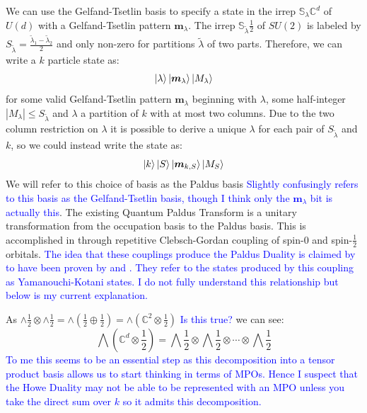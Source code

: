 \documentclass[aps,prx,twocolumn,floatfix,10pt,amssymb,amsfont,amsmath,superscriptaddress,float,nofootinbib,longbibliography,nobalancelastpage]{revtex4-2}
\begin{document}
We can use the Gelfand-Tsetlin basis to specify a state in the irrep $\mathbb{S}_{\lambda} \mathbb{C}^d$ of $U(d)$ with a Gelfand-Tsetlin pattern $\bm m_{\lambda}$. The irrep $\mathbb{S}_{\tilde \lambda} \frac{1}{2}$ of $SU(2)$ is labeled by $S_{\tilde \lambda} =\frac{\tilde \lambda_1 - \tilde \lambda_2}{2}$ and only non-zero for partitions $\tilde \lambda$ of two parts.  Therefore, we can write a $k$ particle state as:
\begin{equation}
    \ket{\lambda} \ket{\bm m_{\lambda}} \ket{M_{\lambda}}
\end{equation}
for some valid Gelfand-Tsetlin pattern $\bm m_{\lambda}$ beginning with $\lambda$, some half-integer $|M_{\lambda}| \leq S_{\tilde \lambda}$ and $\lambda$ a partition of $k$ with at most two columns. Due to the two column restriction on $\lambda$ it is possible to derive a unique $\lambda$ for each pair of $S_{\tilde \lambda}$ and $k$, so we could instead write the state as:
\begin{equation}
    \ket{k}\ket{S}\ket{\bm m_{k,S}} \ket{M_{S}}
\end{equation}
We will refer to this choice of basis as the Paldus basis \textcolor{blue}{Slightly confusingly \cite{burkat2025quantum} refers to this basis as the Gelfand-Tsetlin basis, though I think only the $\bm m_{\lambda}$ bit is actually this}. The existing Quantum Paldus Transform is a unitary transformation from the occupation basis to the Paldus basis. This is accomplished in \cite{burkat2025quantum} through repetitive Clebsch-Gordan coupling of spin-$0$ and spin-$\frac{1}{2}$ orbitals. \textcolor{blue}{The idea that these couplings produce the Paldus Duality is claimed by \cite{burkat2025quantum} to have been proven by \cite{moshinsky1971group} and \cite{paldus1980unitary}. They refer to the states produced by this coupling as Yamanouchi-Kotani states. I do not fully understand this relationship but below is my current explanation. } 

As $\wedge \frac{1}{2} \otimes \wedge \frac{1}{2} = \wedge(\frac{1}{2}\oplus \frac{1}{2}) = \wedge(\mathbb{C}^2\otimes \frac{1}{2})$ \textcolor{blue}{Is this true?} we can see:
\begin{equation}
    \bigwedge(\mathbb{C}^d\otimes \frac{1}{2}) = \bigwedge\frac{1}{2} \otimes \bigwedge\frac{1}{2} \otimes \cdots \otimes \bigwedge\frac{1}{2}
\end{equation}
\textcolor{blue}{To me this seems to be an essential step as this decomposition into a tensor product basis allows us to start thinking in terms of MPOs. Hence I suspect that the Howe Duality may not be able to be represented with an MPO unless you take the direct sum over $k$ so it admits this decomposition.}
\end{document}
